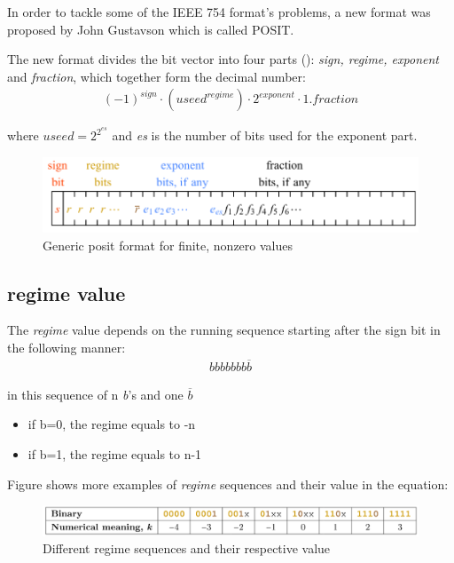 \documentclass[10pt]{article}
\begin{document}
In order to tackle some of the IEEE 754 format's problems, a new format was
proposed by John Gustavson which is called POSIT.

The new format divides the bit vector into four parts ():
\textit{sign, regime, exponent} and \textit{fraction}, which together form the
decimal number:
\begin{align}
{(-1)}^{sign} \cdot ({useed}^{regime}) \cdot {2}^{exponent} \cdot 1.fraction \label{eq:2}
\end{align}

where $useed = 2^{2^{es}}$ and \textit{es} is the number of bits used for the exponent part.

\begin{figure}[h]
  \centering
  \includegraphics*[width=\textwidth]{POSIT_format}
  \caption{Generic posit format for finite, nonzero values}\label{fig:posit_format}
\end{figure}

\subsection{regime value}\label{sec:regime-value}

The \textit{regime} value depends on the running sequence starting after the sign bit in the
following manner:
\begin{align*}
  bbbbbbb\overline{b}
\end{align*}

in this sequence of n \textit{b}'s and one \textit{$\overline{b}$}
\begin{itemize}
  \item if b=0, the regime equals to -n
  \item if b=1, the regime equals to n-1
\end{itemize}

Figure  shows more examples of \textit{regime} sequences and their
value in the  equation:

\begin{figure}[h]
  \centering
  \includegraphics[width=\textwidth, height=0.04\paperheight]{regime_values}
  \caption{Different regime sequences and their respective value}\label{fig:regime_values}
\end{figure}
\end{document}
